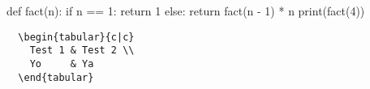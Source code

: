 \documentclass{article}
\begin{document}
\begin{tcolorbox}
  \begin{slverbatim}[language = python]
def fact(n):
    if n == 1:
        return 1
    else:
        return fact(n - 1) * n
print(fact(4))
  \end{slverbatim}
\end{tcolorbox}

\begin{tcolorbox}
  \begin{slverbatim}[language = latex]
\def\test#1{$x^2(t)$}
\begin{verbatim}
  \begin{tabular}{c|c}
    Test 1 & Test 2 \\
    Yo     & Ya
  \end{tabular}
\end{verbatim}
  \end{slverbatim}
\end{tcolorbox}
\end{document}
